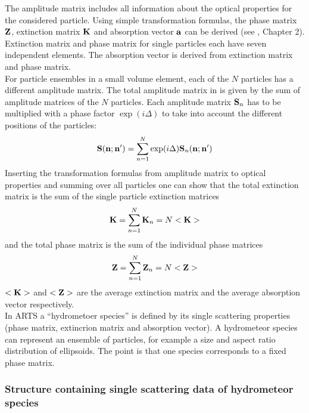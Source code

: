 The amplitude matrix includes all information about the optical properties for the considered particle. Using simple transformation formulas, the phase matrix ${\bf Z}$, extinction matrix ${\bf K}$ and absorption vector ${\bf a}$  can be derived (see  \cite{Mishchenko:02}, Chapter 2).  Extinction matrix and phase matrix for single particles each have seven independent elements. The absorption vector is derived from extinction matrix and phase matrix.\\
For particle ensembles in a small volume element, each of the $N$
particles has a different amplitude matrix. The total amplitude matrix
in is given by the sum of amplitude matrices of the $N$ particles.
Each amplitude matrix ${\bf S}_n$ has to be multiplied with a phase factor
$\exp(i\Delta)$ to take into account the different positions of the
particles:
\begin{equation}
  {\bf S}({\bf n};{\bf n'}) = \sum_{n=1}^{N} \exp(i\Delta)  {\bf S}_n({\bf n};{\bf n'})
\end{equation}
Inserting the transformation formulas from amplitude matrix to optical properties and summing over
all particles one can show that the total extinction matrix is the sum
of the single particle extinction matrices
\begin{equation}
  {\bf K} = \sum_{n=1}^{N} {\bf K}_n = N <{\bf K}>
\end{equation}
and the total phase matrix is the sum of the individual phase matrices
\begin{equation}
  {\bf Z} =  \sum_{n=1}^{N} {\bf Z}_n = N <{\bf Z}>
\end{equation}
$ <{\bf K}>$ and $<{\bf Z}>$ are the average extinction matrix and the average absorption vector respectively. \\

In ARTS a ``hydrometoer species'' is defined by its single scattering properties (phase matrix, extincrion matrix and absorption vector). A hydrometeor species can represent an ensemble of particles, for example a size and aspect ratio distribution of ellipsoids. The point is that one species corresponds to a fixed phase matrix. 


\subsubsection{Structure containing single scattering data of hydrometeor species}
\label{sec:scattering:single_scattering_data}

